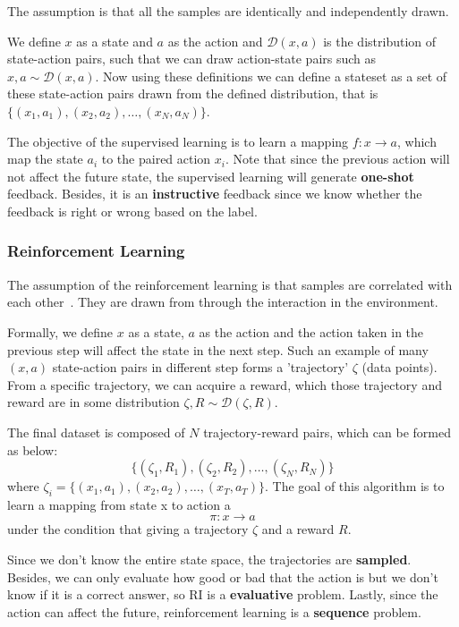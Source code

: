\documentclass[11pt]{article}
\begin{document}
The assumption is that all the samples are identically and independently drawn.

We define $x$ as a state and $a$ as the action and $\mathcal{D} (x,a)$ is the distribution of state-action pairs, such that we can draw action-state pairs such as $x, a \sim \mathcal{D} (x,a) $.
%
Now using these definitions we can define a stateset as a set of these state-action pairs drawn from the defined distribution, that is $\{ (x_1, a_1), (x_2, a_2), \dots, (x_N, a_N) \}$.

The objective of the supervised learning is to learn a mapping $f: x\rightarrow a$, which map the state $a_i$ to the paired action $x_i$. Note that since the previous action will not affect the future state, the supervised learning will generate \textbf{one-shot} feedback. Besides, it is an \textbf{instructive} feedback since we know whether the feedback is right or wrong based on the label.

\subsubsection{Reinforcement Learning}

The assumption of the reinforcement learning is that samples are correlated with each other~\cite{sutton2018reinforcement}. They are drawn from through the interaction in the environment.

Formally, we define $x$ as a state, $a$ as the action and the action taken in the previous step will affect the state in the next step. Such an example of many $(x, a)$ state-action pairs in different step forms a 'trajectory' $\zeta$ (data points). From a specific trajectory, we can acquire a reward, which those trajectory and reward are in some distribution $\zeta, R \sim \mathcal{D}(\zeta, R)$.

The final dataset is composed of $N$ trajectory-reward pairs, which can be formed as below:
$$\{ (\zeta_1, R_1), (\zeta_2, R_2), \dots, (\zeta_N, R_N) \}$$
where $\zeta_i = \{ (x_1, a_1), (x_2, a_2), \dots, (x_T, a_T) \}$.
%
The goal of this algorithm is to learn a mapping from state x to action a 
$$\pi : x \rightarrow a$$
under the condition that giving a trajectory $\zeta$ and a reward $R$.

Since we don't know the entire state space, the trajectories are \textbf{sampled}. Besides, we can only evaluate how good or bad that the action is but we don't know if it is a correct answer, so RI is a \textbf{evaluative} problem. Lastly, since the action can affect the future, reinforcement learning is a \textbf{sequence} problem.
\end{document}
